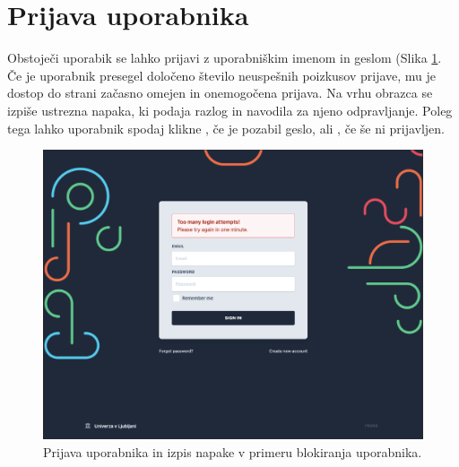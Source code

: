 \documentclass[a4paper, 12pt]{book}
\begin{document}
\newpage
\section{Prijava uporabnika }
\label{sign-in-page}
Obstoječi uporabik se lahko prijavi z uporabniškim imenom in geslom (Slika \ref{login-form}. Če je uporabnik presegel določeno število neuspešnih poizkusov prijave, mu je dostop do strani začasno omejen in onemogočena prijava. Na vrhu obrazca se izpiše ustrezna napaka, ki podaja razlog in navodila za njeno odpravljanje. Poleg tega lahko uporabnik spodaj klikne , če je pozabil geslo, ali , če še ni prijavljen. 



\begin{figure}[h]
\begin{center}
\includegraphics[width=1\textwidth]{slike/signin-throttling.png}
\end{center}
\caption{ Prijava uporabnika in izpis napake v primeru blokiranja uporabnika. }
\label{login-form}
\end{figure}

\end{document}

